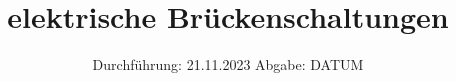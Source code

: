 

\subject{v302}
\title{elektrische Brückenschaltungen}
\date{%
  Durchführung: 21.11.2023
  \hspace{3em}
  Abgabe: DATUM
}



\maketitle
\thispagestyle{empty}
\tableofcontents
\newpage







\printbibliography{}



